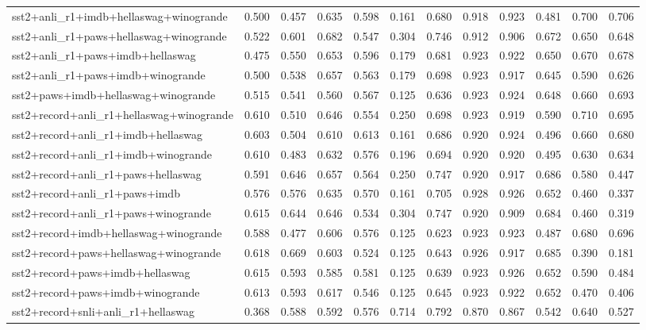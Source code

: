\begin{table}[t]
\begin{tabular}{lrrrrrrrrrrr}
    sst2+anli\_r1+imdb+hellaswag+winogrande & 0.500 & 0.457 & 0.635 & 0.598 & 0.161 & 0.680 & 0.918 & 0.923 & 0.481 & 0.700 & 0.706 \\
    sst2+anli\_r1+paws+hellaswag+winogrande & 0.522 & 0.601 & 0.682 & 0.547 & 0.304 & 0.746 & 0.912 & 0.906 & 0.672 & 0.650 & 0.648 \\
    sst2+anli\_r1+paws+imdb+hellaswag & 0.475 & 0.550 & 0.653 & 0.596 & 0.179 & 0.681 & 0.923 & 0.922 & 0.650 & 0.670 & 0.678 \\
    sst2+anli\_r1+paws+imdb+winogrande & 0.500 & 0.538 & 0.657 & 0.563 & 0.179 & 0.698 & 0.923 & 0.917 & 0.645 & 0.590 & 0.626 \\
    sst2+paws+imdb+hellaswag+winogrande & 0.515 & 0.541 & 0.560 & 0.567 & 0.125 & 0.636 & 0.923 & 0.924 & 0.648 & 0.660 & 0.693 \\
    sst2+record+anli\_r1+hellaswag+winogrande & 0.610 & 0.510 & 0.646 & 0.554 & 0.250 & 0.698 & 0.923 & 0.919 & 0.590 & 0.710 & 0.695 \\
    sst2+record+anli\_r1+imdb+hellaswag & 0.603 & 0.504 & 0.610 & 0.613 & 0.161 & 0.686 & 0.920 & 0.924 & 0.496 & 0.660 & 0.680 \\
    sst2+record+anli\_r1+imdb+winogrande & 0.610 & 0.483 & 0.632 & 0.576 & 0.196 & 0.694 & 0.920 & 0.920 & 0.495 & 0.630 & 0.634 \\
    sst2+record+anli\_r1+paws+hellaswag & 0.591 & 0.646 & 0.657 & 0.564 & 0.250 & 0.747 & 0.920 & 0.917 & 0.686 & 0.580 & 0.447 \\
    sst2+record+anli\_r1+paws+imdb & 0.576 & 0.576 & 0.635 & 0.570 & 0.161 & 0.705 & 0.928 & 0.926 & 0.652 & 0.460 & 0.337 \\
    sst2+record+anli\_r1+paws+winogrande & 0.615 & 0.644 & 0.646 & 0.534 & 0.304 & 0.747 & 0.920 & 0.909 & 0.684 & 0.460 & 0.319 \\
    sst2+record+imdb+hellaswag+winogrande & 0.588 & 0.477 & 0.606 & 0.576 & 0.125 & 0.623 & 0.923 & 0.923 & 0.487 & 0.680 & 0.696 \\
    sst2+record+paws+hellaswag+winogrande & 0.618 & 0.669 & 0.603 & 0.524 & 0.125 & 0.643 & 0.926 & 0.917 & 0.685 & 0.390 & 0.181 \\
    sst2+record+paws+imdb+hellaswag & 0.615 & 0.593 & 0.585 & 0.581 & 0.125 & 0.639 & 0.923 & 0.926 & 0.652 & 0.590 & 0.484 \\
    sst2+record+paws+imdb+winogrande & 0.613 & 0.593 & 0.617 & 0.546 & 0.125 & 0.645 & 0.923 & 0.922 & 0.652 & 0.470 & 0.406 \\
    sst2+record+snli+anli\_r1+hellaswag & 0.368 & 0.588 & 0.592 & 0.576 & 0.714 & 0.792 & 0.870 & 0.867 & 0.542 & 0.640 & 0.527 \\

\end{tabular}
\end{table}
